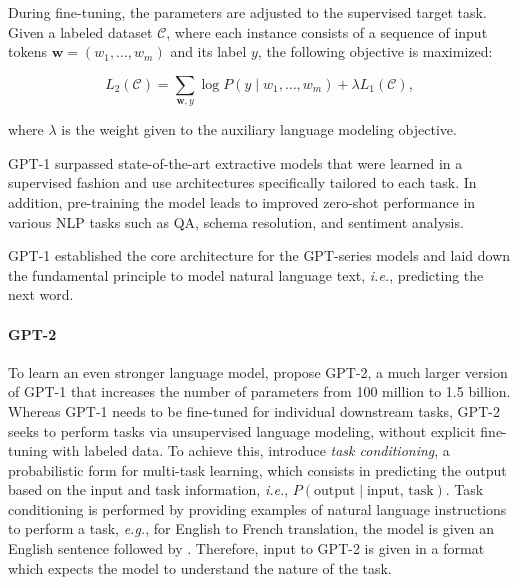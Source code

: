 During fine-tuning, the parameters are adjusted to the supervised target task. Given a labeled dataset $\mathcal{C}$, where each instance consists of a sequence of input tokens $\bm{w} = (w_1, \ldots, w_m)$ and its label $y$, the following objective is maximized:

\begin{equation}
    L_2(\mathcal{C}) = \sum_{\bm{w}, y} \log P(y \mid w_1, \ldots, w_m) + \lambda L_1(\mathcal{C}),
\end{equation}

where $\lambda$ is the weight given to the auxiliary language modeling objective.

\ac{GPT}-1 surpassed state-of-the-art extractive models that were learned in a supervised fashion and use architectures specifically tailored to each task. In addition, pre-training the model leads to improved zero-shot performance in various \ac{NLP} tasks such as \ac{QA}, schema resolution, and sentiment analysis.

\ac{GPT}-1 established the core architecture for the \ac{GPT}-series models and laid down the fundamental principle to model natural language text, \textit{i.e.}, predicting the next word.


\paragraph{GPT-2}

To learn an even stronger language model, \citet{radford2019language} propose \ac{GPT}-2, a much larger version of \ac{GPT}-1 that increases the number of parameters from 100 million to 1.5 billion. Whereas \ac{GPT}-1 needs to be fine-tuned for individual downstream tasks, \ac{GPT}-2 seeks to perform tasks via unsupervised language modeling, without explicit fine-tuning with labeled data. To achieve this, \citet{radford2019language} introduce \textit{task conditioning}, a probabilistic form for multi-task learning, which consists in predicting the output based on the input and task information, \textit{i.e.}, $P(\text{output} \mid \text{input, task})$. Task conditioning is performed by providing examples of natural language instructions to perform a task, \textit{e.g.}, for English to French translation, the model is given an English sentence followed by . Therefore, input to \ac{GPT}-2 is given in a format which expects the model to understand the nature of the task. %

